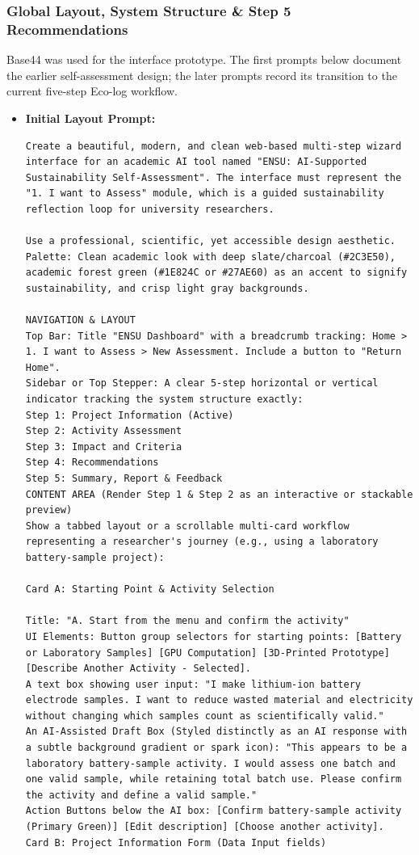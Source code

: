 \documentclass[11pt,a4paper]{article}
\begin{document}
\subsubsection*{Global Layout, System Structure \& Step 5 Recommendations}
\noindent Base44 was used for the interface prototype. The first prompts below document the earlier self-assessment design; the later prompts record its transition to the current five-step Eco-log workflow.
\begin{itemize}[leftmargin=*]
    \item \textbf{Initial Layout Prompt:}
    \begin{lstlisting}
Create a beautiful, modern, and clean web-based multi-step wizard interface for an academic AI tool named "ENSU: AI-Supported Sustainability Self-Assessment". The interface must represent the "1. I want to Assess" module, which is a guided sustainability reflection loop for university researchers.

Use a professional, scientific, yet accessible design aesthetic. Palette: Clean academic look with deep slate/charcoal (#2C3E50), academic forest green (#1E824C or #27AE60) as an accent to signify sustainability, and crisp light gray backgrounds.

NAVIGATION & LAYOUT
Top Bar: Title "ENSU Dashboard" with a breadcrumb tracking: Home > 1. I want to Assess > New Assessment. Include a button to "Return Home".
Sidebar or Top Stepper: A clear 5-step horizontal or vertical indicator tracking the system structure exactly:
Step 1: Project Information (Active)
Step 2: Activity Assessment
Step 3: Impact and Criteria
Step 4: Recommendations
Step 5: Summary, Report & Feedback
CONTENT AREA (Render Step 1 & Step 2 as an interactive or stackable preview)
Show a tabbed layout or a scrollable multi-card workflow representing a researcher's journey (e.g., using a laboratory battery-sample project):

Card A: Starting Point & Activity Selection

Title: "A. Start from the menu and confirm the activity"
UI Elements: Button group selectors for starting points: [Battery or Laboratory Samples] [GPU Computation] [3D-Printed Prototype] [Describe Another Activity - Selected].
A text box showing user input: "I make lithium-ion battery electrode samples. I want to reduce wasted material and electricity without changing which samples count as scientifically valid."
An AI-Assisted Draft Box (Styled distinctly as an AI response with a subtle background gradient or spark icon): "This appears to be a laboratory battery-sample activity. I would assess one batch and one valid sample, while retaining total batch use. Please confirm the activity and define a valid sample."
Action Buttons below the AI box: [Confirm battery-sample activity (Primary Green)] [Edit description] [Choose another activity].
Card B: Project Information Form (Data Input fields)


\end{lstlisting}
\end{itemize}
\end{document}
